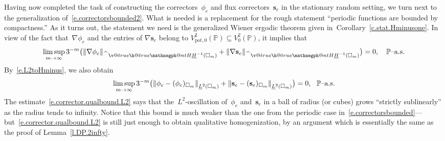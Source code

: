 \documentclass[11pt]{article} %
\makeatletter
\let\oldsquare\square %
\renewcommand{\square}{\oldsquare}
\numberwithin{equation}{section}
\theoremstyle{definition}
\let\originalleft\left
\let\originalright\right
\renewcommand{\left}{\mathopen{}\mathclose\bgroup\originalleft}
\renewcommand{\right}{\aftergroup\egroup\originalright}
\renewcommand*{\hat}{\widehat}
\newcommand{\s}{\mathbf{s}}
\newcommand{\pot}{\mathrm{pot}}
\newcommand{\cu}{\square}
\renewcommand{\P}{\mathbb{P}}
\newcommand{\negphantom}{\v@true\h@true\negph@nt}
\newcommand{\negph@nt}{\ifmmode\expandafter\mathpalette 
  \expandafter\mathnegph@nt\else\expandafter\makenegph@nt\fi}
\newcommand{\makenegph@nt}[1]{%
  \setbox\z@\hbox{\color@begingroup#1\color@endgroup}\finnegph@nt}
\newcommand{\finnegph@nt}{%
  \setbox\tw@\null 
  \ifv@ \ht\tw@\ht\z@\dp\tw@\dp\z@\fi \ifh@\wd\tw@-\wd\z@\fi\box\tw@}
\newcommand{\mathnegph@nt}[2]{%
  \setbox\z@\hbox{$\m@th #1{#2}$}\finnegph@nt}
\newcommand{\Hminusul}{\hat{\phantom{H}}\negphantom{H}\underline{H}^{-1}}
\makeatother
\begin{document}
Having now completed the task of constructing the correctors~$\phi_e$ and flux correctors~$\s_e$ in the stationary random setting, we turn next to the generalization of~\eqref{e.correctorsbounded2}. What is needed is a replacement for the rough statement ``periodic functions are bounded by compactness.'' As it turns out, the statement we need is the generalized Wiener ergodic theorem given in~Corollary~\ref{c.stat.Hminusone}. In view of the fact that~$\nabla \phi_e$ and the entries of $\nabla \s_e$ belong to $V^2_{\pot,0}(\P) \subseteq V^2_0(\P)$, it implies that
\begin{equation}
\label{e.corrector.qualbound.Hm1}
\limsup_{m\to \infty}
3^{-m} 
\bigl(
\| \nabla \phi_e \|_{\Hminusul(\cu_m)}
+
\| \nabla \s_e \|_{\Hminusul(\cu_m)}
\bigr) = 0,
\quad \mbox{$\P$--a.s.}
\end{equation}
By~\eqref{e.L2toHminus}, we also obtain
\begin{equation}
\label{e.corrector.qualbound.L2}
\limsup_{m\to \infty}
3^{-m} 
\bigl(
\left\|  \phi_e - (\phi_e)_{\cu_m} \right\|_{\underline{L}^{2}(\cu_m)}
+
\left\|  \s_e - (\s_e)_{\cu_m} \right\|_{\underline{L}^{2}(\cu_m)}
\bigr) = 0,
\ \ \mbox{$\P$--a.s.}
\end{equation}
The estimate~\eqref{e.corrector.qualbound.L2} says that the~$L^2$-oscillation of~$\phi_e$ and~$\s_e$ in a ball of radius (or cubes) grows ``strictly sublinearly'' as the radius tends to infinity. Notice that this bound is much weaker than the one from the periodic case in~\eqref{e.correctorsbounded}---but~\eqref{e.corrector.qualbound.L2} is still just enough to obtain qualitative homogenization, by an argument which is essentially the same as the proof of Lemma~\ref{l.DP.2infty}.
\end{document}
